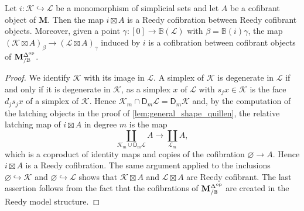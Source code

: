\documentclass[10pt,reqno]{amsart}
\begin{document}
\begin{lemma}
\label{lem:shape_inclusion_cofibrant}
Let $i:\mathcal K\hookrightarrow\mathcal L$ be a monomorphism
of simplicial sets and let $A$ be a cofibrant object of
$\mathbf M$. Then the map $i\boxtimes A$ is a Reedy cofibration
between Reedy cofibrant objects. Moreover, given a point
$\gamma:[0]\to\mathbb B(\mathcal L)$ with
$\beta=\mathbb B(i)\gamma$, the map
$(\mathcal K\boxtimes A)_\beta\to(\mathcal L\boxtimes A)_\gamma$
induced by $i$ is a cofibration between cofibrant objects of
$\mathbf M^{\Delta^{\mathrm{op}}}_{/\mathbb B}$.
\end{lemma}
\begin{proof}
We identify $\mathcal K$ with its image in $\mathcal L$. A simplex
of $\mathcal K$ is degenerate in $\mathcal L$ if and only if it is
degenerate in $\mathcal K$, as a simplex $x$ of $\mathcal L$ with
$s_jx\in\mathcal K$ is the face $d_js_jx$ of a simplex of
$\mathcal K$. Hence
$\mathcal K_m\cap\mathsf D_m\mathcal L=\mathsf D_m\mathcal K$ and,
by the computation of the latching objects in the proof of
\cref{lem:general_shape_quillen}, the relative latching map of
$i\boxtimes A$ in degree $m$ is the map
\[
\coprod_{\mathcal K_m\cup\mathsf D_m\mathcal L}A
\longrightarrow\coprod_{\mathcal L_m}A,
\]
which is a coproduct of identity maps and copies of the cofibration
$\varnothing\to A$. Hence $i\boxtimes A$ is a Reedy cofibration.
The same argument applied to the inclusions
$\varnothing\hookrightarrow\mathcal K$ and
$\varnothing\hookrightarrow\mathcal L$ shows that
$\mathcal K\boxtimes A$ and $\mathcal L\boxtimes A$ are Reedy
cofibrant. The last assertion follows from the fact that the
cofibrations of $\mathbf M^{\Delta^{\mathrm{op}}}_{/\mathbb B}$ are created in the Reedy model
structure.
\end{proof}
\end{document}
